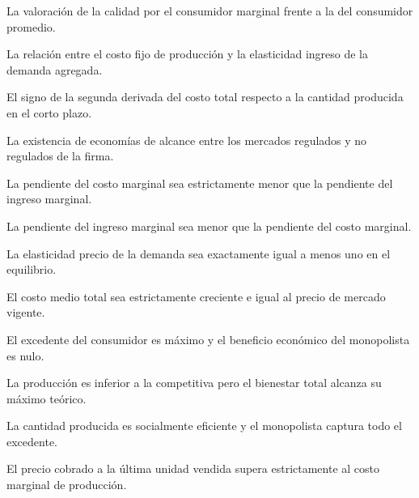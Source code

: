 \begin{opts}
    \item La valoración de la calidad por el consumidor marginal frente a la del consumidor promedio.
    \item La relación entre el costo fijo de producción y la elasticidad ingreso de la demanda agregada.
    \item El signo de la segunda derivada del costo total respecto a la cantidad producida en el corto plazo.
    \item La existencia de economías de alcance entre los mercados regulados y no regulados de la firma.
\end{opts}

\begin{opts}
    \item La pendiente del costo marginal sea estrictamente menor que la pendiente del ingreso marginal.
    \item La pendiente del ingreso marginal sea menor que la pendiente del costo marginal.
    \item La elasticidad precio de la demanda sea exactamente igual a menos uno en el equilibrio.
    \item El costo medio total sea estrictamente creciente e igual al precio de mercado vigente.
\end{opts}

\begin{opts}
    \item El excedente del consumidor es máximo y el beneficio económico del monopolista es nulo.
    \item La producción es inferior a la competitiva pero el bienestar total alcanza su máximo teórico.
    \item La cantidad producida es socialmente eficiente y el monopolista captura todo el excedente.
    \item El precio cobrado a la última unidad vendida supera estrictamente al costo marginal de producción.
\end{opts}


